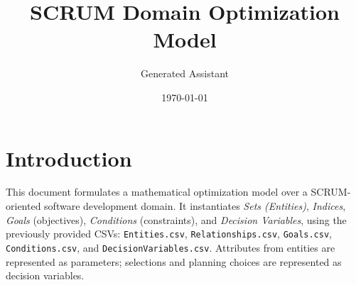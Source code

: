 \documentclass[11pt,a4paper]{article}
\title{SCRUM Domain Optimization Model}
\author{Generated Assistant}
\date{\today}
\begin{document}
\maketitle
\tableofcontents
\newpage

\section*{Introduction}
This document formulates a mathematical optimization model over a SCRUM-oriented software development domain. 
It instantiates \emph{Sets (Entities)}, \emph{Indices}, \emph{Goals} (objectives), \emph{Conditions} (constraints), and \emph{Decision Variables}, using the previously provided CSVs: \texttt{Entities.csv}, \texttt{Relationships.csv}, \texttt{Goals.csv}, \texttt{Conditions.csv}, and \texttt{DecisionVariables.csv}. 
Attributes from entities are represented as parameters; selections and planning choices are represented as decision variables.
\end{document}
